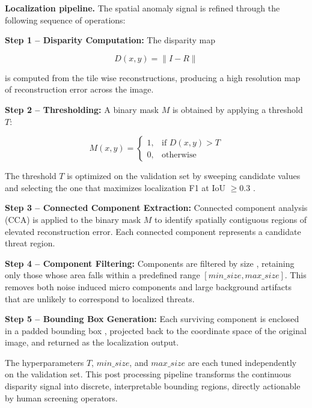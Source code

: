 \documentclass{bmvc2k}
\begin{document}
\textbf{Localization pipeline.} The spatial anomaly signal is refined through the following sequence of operations:

\textbf{Step 1 -- Disparity Computation:}
The disparity map

\begin{equation}
D(x,y) = \| I - R \|
\end{equation}

is computed from the tile wise reconstructions, producing a high resolution map of reconstruction error across the image.

\textbf{Step 2 -- Thresholding:}
A binary mask $M$ is obtained by applying a threshold $T$:

\begin{equation}
M(x,y) =
\begin{cases}
1, & \text{if } D(x,y) > T \\
0, & \text{otherwise}
\end{cases}
\end{equation}

The threshold $T$ is optimized on the validation set by sweeping candidate values and selecting the one that maximizes localization F1 at IoU $\geq 0.3$ \cite{bergmann2019mvtec, yi2020patchsvdd}.

\textbf{Step 3 -- Connected Component Extraction:}
Connected component analysis (CCA) is applied \cite{hassan2021unsupervised} to the binary mask $M$ to identify spatially contiguous regions of elevated reconstruction error. Each connected component represents a candidate threat region.

\textbf{Step 4 -- Component Filtering:}
Components are filtered by size \cite{hassan2021unsupervised}, retaining only those whose area falls within a predefined range $[min\_size, max\_size]$. This removes both noise induced micro components and large background artifacts that are unlikely to correspond to localized threats.

\textbf{Step 5 -- Bounding Box Generation:}
Each surviving component is enclosed in a padded bounding box \cite{defard2020padim}, projected back to the coordinate space of the original image, and returned as the localization output.

The hyperparameters $T$, $min\_size$, and $max\_size$ are each tuned independently on the validation set. This post processing pipeline transforms the continuous disparity signal into discrete, interpretable bounding regions, directly actionable by human screening operators.
\end{document}

